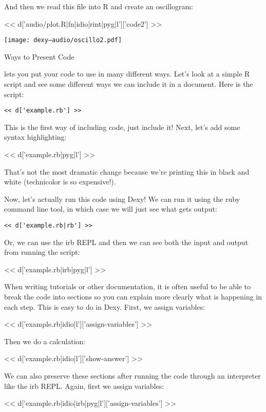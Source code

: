 \documentclass[custom, plainsections]{sciposter}
\begin{document}
\begin{multicols*}{2}
And then we read this file into R and create an oscillogram:

<< d['audio/plot.R|fn|idio|rint|pyg|l']['code2'] >>

\texttt{[image: dexy--audio/oscillo2.pdf]}

\large
Ways to Present Code
\small

\label{sec:present-code}

\vspace{5pt}

 lets you put your code to use in many different ways. Let's look at a simple R script and see some different ways we can include it in a document. Here is the script:

\begin{Verbatim}
<< d['example.rb'] >>
\end{Verbatim}

This is the first way of including code, just include it! Next, let's add some syntax highlighting:

<< d['example.rb|pyg|l'] >>

That's not the most dramatic change because we're printing this in black and white (technicolor is so expensive!).

Now, let's actually run this code using Dexy! We can run it using the ruby command line tool, in which case we will just see what gets output:

\begin{Verbatim}
<< d['example.rb|rb'] >>
\end{Verbatim}

Or, we can use the irb REPL and then we can see both the input and output from running the script:

<< d['example.rb|irb|pyg|l'] >>

When writing tutorials or other documentation, it is often useful to be able to break the code into sections so you can explain more clearly what is happening in each step. This is easy to do in Dexy. First, we assign variables:

<< d['example.rb|idio|l']['assign-variables'] >>

Then we do a calculation:

<< d['example.rb|idio|l']['show-answer'] >>

We can also preserve these sections after running the code through an interpreter like the irb REPL. Again, first we assign variables:

<< d['example.rb|idio|irb|pyg|l']['assign-variables'] >>


\end{multicols*}
\end{document}
